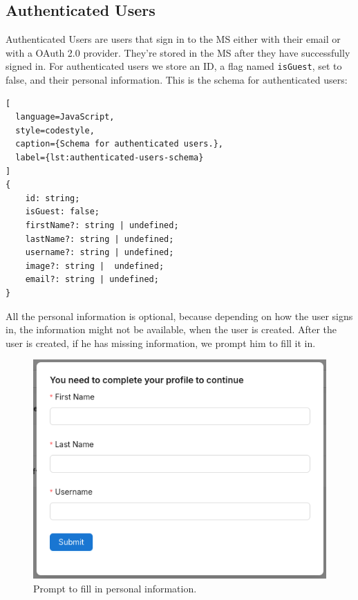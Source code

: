 \subsection{Authenticated Users}
\label{cha:ms-architecture:authenticated-users}

Authenticated Users are users that sign in to the MS either with their email or with a
OAuth 2.0 provider.
They're stored in the MS after they have successfully signed in.
For authenticated users we store an ID, a flag named \lstinline{isGuest}, set
to false, and their personal information.
This is the schema for authenticated users:


\begin{lstlisting}[
  language=JavaScript,
  style=codestyle,
  caption={Schema for authenticated users.},
  label={lst:authenticated-users-schema}
]
{
    id: string;
    isGuest: false;
    firstName?: string | undefined;
    lastName?: string | undefined;
    username?: string | undefined;
    image?: string |  undefined;
    email?: string | undefined;
}
\end{lstlisting}

All the personal information is optional, because depending on how the user signs in, the
information might not be available, when the user is created.
After the user is created, if he has missing information, we prompt him to fill it in.

\begin{figure}[H]
	\centering
	\includegraphics[scale=0.4]{images/fill-data-prompt.png}
	\caption{Prompt to fill in personal information.}
	\vspace{-1em} %
	\label{fig:prompt-fill-personal-information}
\end{figure}

